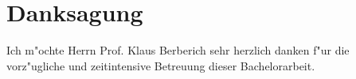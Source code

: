

\bigskip

\begingroup
	\let\clearpage\relax
	\let\cleardoublepage\relax
	\let\cleardoublepage\relax
	\chapter*{Danksagung}
	Ich m"ochte Herrn Prof. Klaus Berberich sehr herzlich danken f"ur die vorz"ugliche und
zeitintensive Betreuung dieser Bachelorarbeit.




\endgroup

